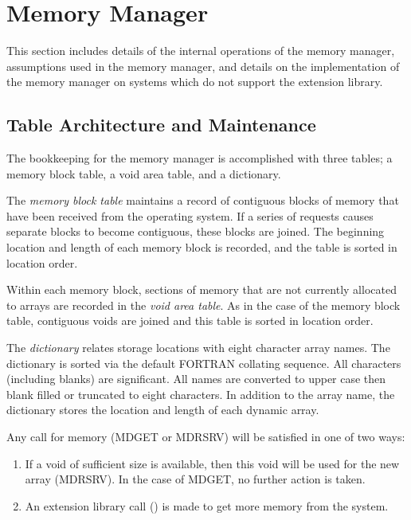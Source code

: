\section{Memory Manager} \label{sec:table}
This section includes details of the internal operations of the memory
manager, assumptions used in the memory manager, and details on the
implementation of the memory manager on systems which do not support the
extension library.


\subsection{Table Architecture and Maintenance}
The bookkeeping for the memory manager is accomplished with three tables; a
memory block table, a void area table, and a dictionary.

The {\em
memory block table} maintains a record of contiguous blocks of memory
that have been received from the operating system.  If a series of requests
causes separate blocks to become contiguous, these blocks are joined.  The
beginning location and length of each memory block is recorded, and the
table is sorted in location order.

Within each memory block, sections of memory that are not currently
allocated to arrays are recorded in the {\em void area table}.  As in the
case of the memory block table, contiguous voids are joined and this table
is sorted in location order.

The {\em dictionary} relates storage locations with eight character array
names. The dictionary is sorted via the default FORTRAN collating sequence.
All characters (including blanks) are significant.
All names are converted to upper case then
blank filled or truncated to eight characters.
In addition to the array name, the
dictionary stores the location and length of each dynamic array.

Any call for memory (MDGET or MDRSRV) will be satisfied in one of two ways:
\begin{enumerate}
\item If a void of sufficient size is available, then this void will be
          used for the new array (MDRSRV).  In the case of MDGET, no further
          action is taken.

\item An extension library call () is made to get more memory from
          the system.
\end{enumerate}

